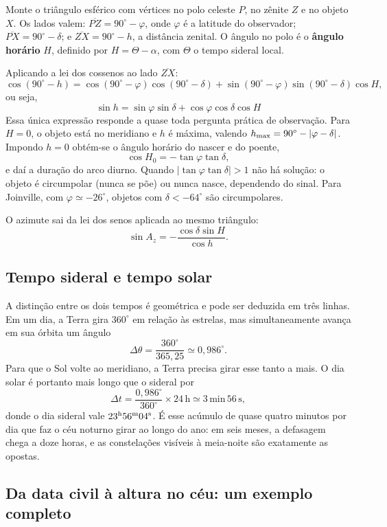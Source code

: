 \documentclass[11pt,a4paper]{article}
\begin{document}
Monte o triângulo esférico com vértices no polo celeste $P$, no zênite $Z$ e no objeto $X$. Os lados valem: $\overline{PZ}=90^\circ-\varphi$, onde $\varphi$ é a latitude do observador; $\overline{PX}=90^\circ-\delta$; e $\overline{ZX}=90^\circ-h$, a distância zenital. O ângulo no polo é o \textbf{ângulo horário} $H$, definido por $H=\Theta-\alpha$, com $\Theta$ o tempo sideral local.

Aplicando a lei dos cossenos ao lado $\overline{ZX}$:
\[
\cos(90^\circ-h)=\cos(90^\circ-\varphi)\cos(90^\circ-\delta)+\sin(90^\circ-\varphi)\sin(90^\circ-\delta)\cos H,
\]
ou seja,
\[
\boxed{\ \sin h=\sin\varphi\sin\delta+\cos\varphi\cos\delta\cos H\ }
\]
Essa única expressão responde a quase toda pergunta prática de observação. Para $H=0$, o objeto está no meridiano e $h$ é máxima, valendo $h_{\rm max}=90^\circ-|\varphi-\delta|$. Impondo $h=0$ obtém-se o ângulo horário do nascer e do poente,
\[
\cos H_0=-\tan\varphi\tan\delta,
\]
e daí a duração do arco diurno. Quando $|\tan\varphi\tan\delta|>1$ não há solução: o objeto é circumpolar (nunca se põe) ou nunca nasce, dependendo do sinal. Para Joinville, com $\varphi\simeq-26^\circ$, objetos com $\delta<-64^\circ$ são circumpolares.

O azimute sai da lei dos senos aplicada ao mesmo triângulo:
\[
\sin A_z=-\frac{\cos\delta\sin H}{\cos h}.
\]

\subsection*{Tempo sideral e tempo solar}

A distinção entre os dois tempos é geométrica e pode ser deduzida em três linhas. Em um dia, a Terra gira $360^\circ$ em relação às estrelas, mas simultaneamente avança em sua órbita um ângulo
\[
\Delta\theta=\frac{360^\circ}{365{,}25}\simeq0{,}986^\circ.
\]
Para que o Sol volte ao meridiano, a Terra precisa girar esse tanto a mais. O dia solar é portanto mais longo que o sideral por
\[
\Delta t=\frac{0{,}986^\circ}{360^\circ}\times24\,\mathrm{h}\simeq3\,\mathrm{min}\,56\,\mathrm{s},
\]
donde o dia sideral vale $23^{\rm h}56^{\rm m}04^{\rm s}$. É esse acúmulo de quase quatro minutos por dia que faz o céu noturno girar ao longo do ano: em seis meses, a defasagem chega a doze horas, e as constelações visíveis à meia-noite são exatamente as opostas.

\subsection*{Da data civil à altura no céu: um exemplo completo}
\end{document}
